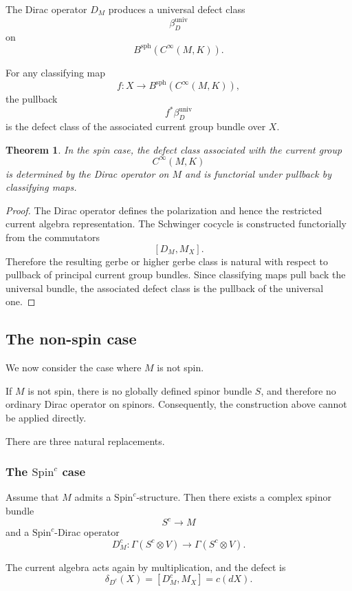 \documentclass[11pt]{amsart}
\newtheorem{theorem}[definition]{Theorem}
\begin{document}
The Dirac operator \(D_M\) produces a universal defect class
\[
\beta_D^{\mathrm{univ}}
\]
on
\[
B^{\mathrm{sph}}(C^\infty(M,K)).
\]

For any classifying map
\[
f:X\to B^{\mathrm{sph}}(C^\infty(M,K)),
\]
the pullback
\[
f^*\beta_D^{\mathrm{univ}}
\]
is the defect class of the associated current group bundle over \(X\).

\begin{theorem}
In the spin case, the defect class associated with the current group
\[
C^\infty(M,K)
\]
is determined by the Dirac operator on \(M\) and is functorial under pullback by classifying maps.
\end{theorem}

\begin{proof}
The Dirac operator defines the polarization and hence the restricted current algebra representation. The Schwinger cocycle is constructed functorially from the commutators
\[
[D_M,M_X].
\]
Therefore the resulting gerbe or higher gerbe class is natural with respect to pullback of principal current group bundles. Since classifying maps pull back the universal bundle, the associated defect class is the pullback of the universal one.
\end{proof}

\subsection{The non-spin case}

We now consider the case where \(M\) is not spin.

If \(M\) is not spin, there is no globally defined spinor bundle \(S\), and therefore no ordinary Dirac operator on spinors. Consequently, the construction above cannot be applied directly.

There are three natural replacements.

\subsubsection{The \(\mathrm{Spin}^c\) case}

Assume that \(M\) admits a \(\mathrm{Spin}^c\)-structure. Then there exists a complex spinor bundle
\[
S^c\to M
\]
and a \(\mathrm{Spin}^c\)-Dirac operator
\[
D_M^c:\Gamma(S^c\otimes V)\to \Gamma(S^c\otimes V).
\]

The current algebra acts again by multiplication, and the defect is
\[
\delta_{D^c}(X)=[D_M^c,M_X]=c(dX).
\]
\end{document}
